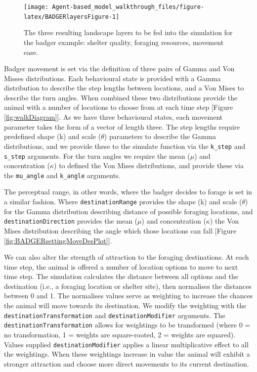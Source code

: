 \documentclass[10pt,a4paper]{article}
\begin{document}
\begin{figure}

{\centering \texttt{[image: Agent-based\_model\_walkthrough\_files/figure-latex/BADGERlayersFigure-1]} 

}

\caption{The three resulting landscape layers to be fed into the simulation for the badger example: shelter quality, foraging resources, movement ease.}\label{fig:BADGERlayersFigure}
\end{figure}

Badger movement is set via the definition of three pairs of Gamma and Von Misses distributions.
Each behavioural state is provided with a Gamma distribution to describe the step lengths between locations, and a Von Mises to describe the turn angles.
When combined these two distributions provide the animal with a number of locations to choose from at each time step {[}Figure \ref{fig:walkDiagram}{]}.
As we have three behavioural states, each movement parameter takes the form of a vector of length three.
The step lengths require predefined shape (k) and scale (\(\theta\)) parameters to describe the Gamma distributions, and we provide these to the simulate function via the \texttt{k\_step} and \texttt{s\_step} arguments.
For the turn angles we require the mean (\(\mu\)) and concentration (\(\kappa\)) to defined the Von Mises distributions, and provide these via the \texttt{mu\_angle} and \texttt{k\_angle} arguments.

The perceptual range, in other words, where the badger decides to forage is set in a similar fashion.
Where \texttt{destinationRange} provides the shape (k) and scale (\(\theta\)) for the Gamma distribution describing distance of possible foraging locations, and \texttt{destinationDirection} provides the mean (\(\mu\)) and concentration (\(\kappa\)) the Von Mises distribution describing the angle which those locations can fall {[}Figure \ref{fig:BADGERsettingMoveDesPlot}{]}.

We can also alter the strength of attraction to the foraging destinations.
At each time step, the animal is offered a number of location options to move to next time step.
The simulation calculates the distance between all options and the destination (i.e., a foraging location or shelter site), then normalises the distances between 0 and 1.
The normalises values serve as weighting to increase the chances the animal will move towards its destination.
We modify the weighting with the \texttt{destinationTransformation} and \texttt{destinationModifier} arguments.
The \texttt{destinationTransformation} allows for weightings to be transformed (where 0 = no transformation, 1 = weights are square-rooted, 2 = weights are squared).
Values supplied \texttt{destinationModifier} applies a linear multiplicative effect to all the weightings.
When these weightings increase in value the animal will exhibit a stronger attraction and choose more direct movements to its current destination.
\end{document}
